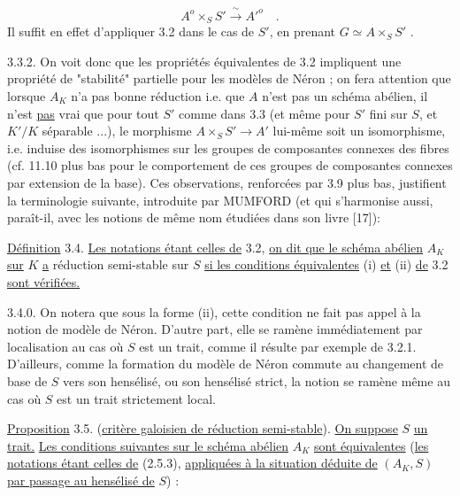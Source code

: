 \begin{equation}\tag{3.3.1}
A^o \times_S S' \xrightarrow{\ \sim\ } {A'}^{o} \quad .
\end{equation}
Il suffit en effet d'appliquer 3.2 dans le cas de $S'$, en prenant $G \simeq A \times_S S'$ .



3.3.2. On voit donc que les propriétés équivalentes de 3.2 impliquent une propriété de "stabilité" partielle pour les modèles de Néron ; on fera attention que lorsque $A_K$ n'a pas bonne réduction i.e. que $A$ n'est pas un schéma abélien, il n'est \underline{pas} vrai que pour tout $S'$ comme dans 3.3 (et même pour $S'$ fini sur $S$, et $K'/K$ séparable ...), le morphisme $A \times_S S' \longrightarrow A'$ lui-même soit un isomorphisme, i.e. induise des isomorphismes sur les groupes de composantes connexes des fibres (cf. 11.10 plus bas pour le comportement de ces groupes de composantes connexes par extension de la base). Ces observations, renforcées par 3.9 plus bas, justifient la terminologie suivante, introduite par MUMFORD (et qui s'harmonise aussi, paraît-il, avec les notions de même nom étudiées dans son livre [17]):

\underline{Définition} 3.4. \underline{Les notations étant celles de} 3.2, \underline{on dit que le schéma abélien} $A_K$ \underline{sur} $K$ \underline{a} réduction semi-stable sur $S$ \underline{si les conditions équivalentes} (i) \underline{et} (ii) \underline{de} 3.2 \underline{sont vérifiées.}

3.4.0. On notera que sous la forme (ii), cette condition ne fait pas appel à la notion de modèle de Néron. D'autre part, elle se ramène immédiatement par localisation au cas où $S$ est un trait, comme il résulte par exemple de 3.2.1. D'ailleurs, comme la formation du modèle de Néron commute au changement de base de $S$ vers son hensélisé, ou son hensélisé strict, la notion se ramène même au cas où $S$ est un trait strictement local.



\underline{Proposition} 3.5. (\underline{critère galoisien de réduction semi-stable}). \underline{On suppose} $S$ \underline{un trait.} \underline{Les conditions suivantes sur le schéma abélien} $A_K$ \underline{sont équivalentes} (\underline{les notations étant celles de} (2.5.3), \underline{appliquées à la situation déduite de} $(A_K,S)$ \underline{par passage au hensélisé de} $S$) :


